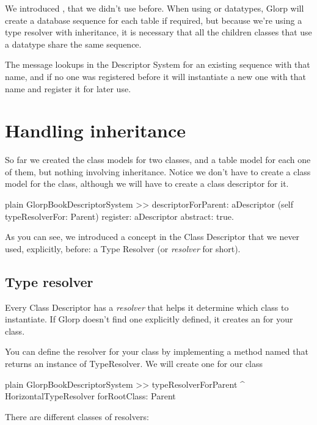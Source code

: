 \documentclass[10pt,twoside,english]{_support/latex/sbabook/sbabook}
\begin{document}
We introduced , that we didn't use before. When using
 or  datatypes, Glorp will create a database sequence
for each table if required, but because we're using a type resolver
with inheritance, it is necessary that all the children classes that use
a  datatype share the same sequence. 

The message  lookups in the Descriptor System for an existing sequence with that name,
and if no one was registered before it will instantiate a new one with that name and register it for later use.
\section{Handling inheritance}
So far we created the class models for two classes, and a table model for each
one of them, but nothing involving inheritance. Notice we don't have to create a
class model for the  class, although we will have to create a
class descriptor for it.

\begin{displaycode}{plain}
GlorpBookDescriptorSystem >> descriptorForParent: aDescriptor
	(self typeResolverFor: Parent) register: aDescriptor abstract: true.
\end{displaycode}

As you can see, we introduced a concept in the Class Descriptor that
we never used, explicitly, before: a Type Resolver (or \textit{resolver} for short).
\subsection{Type resolver }
Every Class Descriptor has a \textit{resolver} that helps it determine which
class to instantiate. If Glorp doesn't find one explicitly defined,  it 
creates an  for your class.

You can define the resolver for your class by implementing a method
named  that returns an instance of TypeResolver.
We will create one for our class 

\begin{displaycode}{plain}
GlorpBookDescriptorSystem >> typeResolverForParent
	^ HorizontalTypeResolver forRootClass: Parent
\end{displaycode}

There are different classes of resolvers:
\end{document}

